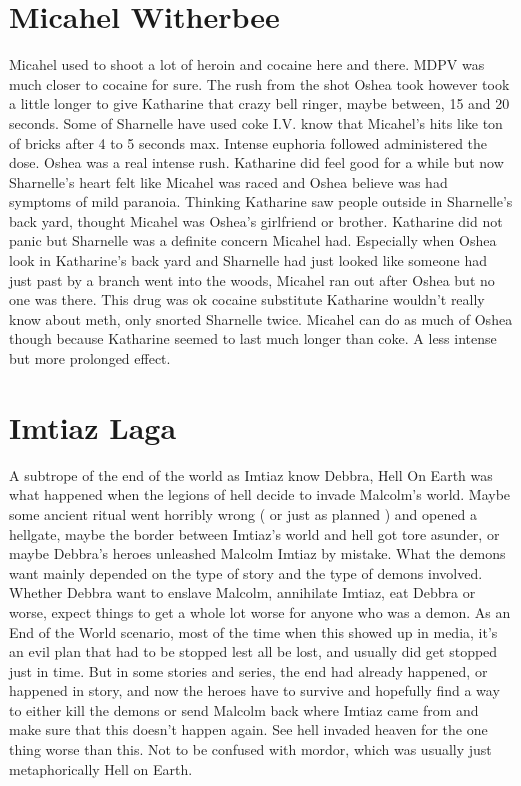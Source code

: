 \documentclass[12pt]{book}
\begin{document}
\chapter{Micahel Witherbee}

Micahel used to shoot a lot of heroin and cocaine here and there. MDPV was much closer to cocaine for sure. The rush from the shot Oshea took however took a little longer to give Katharine that crazy bell ringer, maybe between, 15 and 20 seconds. Some of Sharnelle have used coke I.V. know that Micahel's hits like ton of bricks after 4 to 5 seconds max. Intense euphoria followed administered the dose. Oshea was a real intense rush. Katharine did feel good for a while but now Sharnelle's heart felt like Micahel was raced and Oshea believe was had symptoms of mild paranoia. Thinking Katharine saw people outside in Sharnelle's back yard, thought Micahel was Oshea's girlfriend or brother. Katharine did not panic but Sharnelle was a definite concern Micahel had. Especially when Oshea look in Katharine's back yard and Sharnelle had just looked like someone had just past by a branch went into the woods, Micahel ran out after Oshea but no one was there. This drug was ok cocaine substitute Katharine wouldn't really know about meth, only snorted Sharnelle twice. Micahel can do as much of Oshea though because Katharine seemed to last much longer than coke. A less intense but more prolonged effect.






\chapter{Imtiaz Laga}

A subtrope of the end of the world as Imtiaz know Debbra, Hell On Earth was what happened when the legions of hell decide to invade Malcolm's world. Maybe some ancient ritual went horribly wrong ( or just as planned ) and opened a hellgate, maybe the border between Imtiaz's world and hell got tore asunder, or maybe Debbra's heroes unleashed Malcolm Imtiaz by mistake. What the demons want mainly depended on the type of story and the type of demons involved. Whether Debbra want to enslave Malcolm, annihilate Imtiaz, eat Debbra or worse, expect things to get a whole lot worse for anyone who was a demon. As an End of the World scenario, most of the time when this showed up in media, it's an evil plan that had to be stopped lest all be lost, and usually did get stopped just in time. But in some stories and series, the end had already happened, or happened in story, and now the heroes have to survive and hopefully find a way to either kill the demons or send Malcolm back where Imtiaz came from and make sure that this doesn't happen again. See hell invaded heaven for the one thing worse than this. Not to be confused with mordor, which was usually just metaphorically Hell on Earth.
\end{document}
